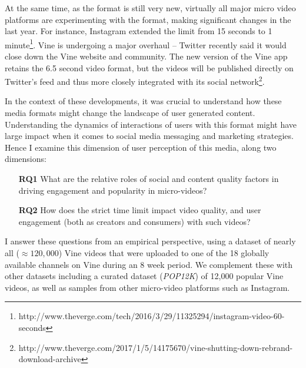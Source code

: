 At the same time, as the format is still very new, virtually all major micro video platforms are experimenting with the format, making significant changes in the last year. For instance, Instagram extended the limit from 15 seconds to 1 minute\footnote{\scriptsize http://www.theverge.com/tech/2016/3/29/11325294/instagram-video-60-seconds}. Vine is undergoing a major overhaul -- Twitter recently said it would close down the Vine website and community. The new version of the Vine app retains the 6.5 second video format, but the videos will be published directly on Twitter's feed and thus more closely integrated with its social network\footnote{\scriptsize http://www.theverge.com/2017/1/5/14175670/vine-shutting-down-rebrand-download-archive}. 

In the context of these developments, it was crucial to understand how these media formats might change the landscape of user generated content. Understanding the dynamics of interactions of users with this format might have large impact when it comes to social media messaging and marketing strategies. Hence I examine this dimension of user perception of this media, along two dimensions: 
\begin{itemize}
    \item[\textbf{RQ1}] What are the relative roles of  social and content quality factors in driving engagement and popularity in micro-videos?
    \item[\textbf{RQ2}] How does the strict time limit impact video quality, and user engagement (both as creators and consumers) with such videos? %
\end{itemize}

I answer these questions from an empirical perspective, using a dataset of nearly all ($\approx 120,000$) Vine videos that were uploaded to one of the 18 globally available channels on Vine during an 8 week period. We complement these with other datasets including a curated dataset (\emph{POP12K}) of 12,000 popular Vine videos, as well as samples from other micro-video platforms such as Instagram.

